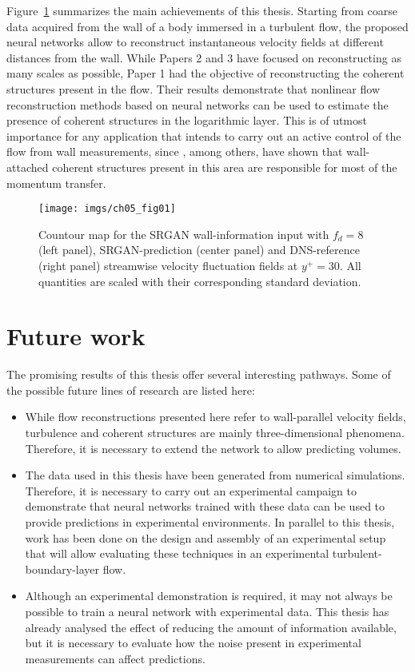 Figure~\ref{ch05:fig01} summarizes the main achievements of this thesis.
Starting from coarse data acquired from the wall of a body immersed in a turbulent flow, the proposed neural networks allow to reconstruct instantaneous velocity fields at different distances from the wall.
While Papers 2 and 3 have focused on reconstructing as many scales as possible, Paper 1 had the objective of reconstructing the coherent structures present in the flow.
Their results demonstrate that nonlinear flow reconstruction methods based on neural networks can be used to estimate the presence of coherent structures in the logarithmic layer.
This is of utmost importance for any application that intends to carry out an active control of the flow from wall measurements, since \citet{lozano2014time}, among others, have shown that wall-attached coherent structures present in this area are responsible for most of the momentum transfer.

\begin{figure}
  \centering
  \texttt{[image: imgs/ch05\_fig01]}
  \caption{\label{ch05:fig01}Countour map for the SRGAN wall-information input with $f_d=8$ (left panel), SRGAN-prediction (center panel) and DNS-reference (right panel) streamwise velocity fluctuation fields at $y^+=30$. All quantities are scaled with their corresponding standard deviation.}
\end{figure}

\section{Future work}
The promising results of this thesis offer several interesting pathways.
Some of the possible future lines of research are listed here:

\begin{itemize}
\item While flow reconstructions presented here refer to wall-parallel velocity fields, turbulence and coherent structures are mainly three-dimensional phenomena.
Therefore, it is necessary to extend the network to allow predicting volumes.
\item The data used in this thesis have been generated from numerical simulations.
Therefore, it is necessary to carry out an experimental campaign to demonstrate that neural networks trained with these data can be used to provide predictions in experimental environments.
In parallel to this thesis, work has been done on the design and assembly of an experimental setup that will allow evaluating these techniques in an experimental turbulent-boundary-layer flow.
\item Although an experimental demonstration is required, it may not always be possible to train a neural network with experimental data.
This thesis has already analysed the effect of reducing the amount of information available, but it is necessary to evaluate how the noise present in experimental measurements can affect predictions.
\end{itemize}

